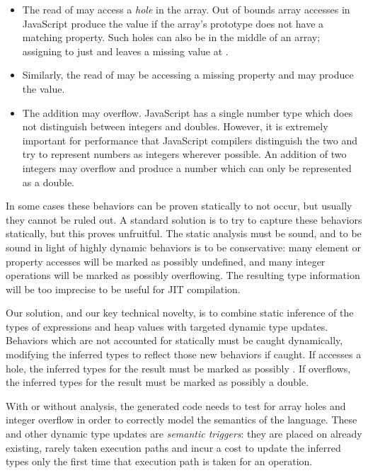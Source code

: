 \begin{itemize}

\item The read of  may access a {\it hole} in the array.
Out of bounds array accesses in JavaScript produce the
 value if the array's prototype
does not have a matching property.
Such holes can also be in the middle of an array;
assigning to just  and  leaves a missing
value at .

\item Similarly, the read of  may be accessing a missing property
and may produce the  value.

\item The addition  may overflow.
JavaScript has a single number type which does not distinguish between
integers and doubles.
However, it is extremely important for performance that JavaScript compilers
distinguish the two and try to represent numbers as
integers wherever possible.
An addition of two integers may overflow and produce a number which can
only be represented as a double.

\end{itemize}

In some cases these behaviors can be proven statically to not occur,
but usually they cannot be ruled out.
A standard solution is to try to capture these behaviors statically, but this proves
unfruitful. The static analysis must be sound, and to be sound in
light of highly dynamic behaviors is to be conservative: many element or property
accesses will be marked as possibly undefined, and many integer operations
will be marked as possibly overflowing.
The resulting type information will be too imprecise to be useful for
JIT compilation.

Our solution, and our key technical novelty, is to combine static inference
of the types of expressions and heap values
with targeted dynamic type updates.
Behaviors which are not accounted for statically must be caught dynamically,
modifying the inferred types to reflect
those new behaviors if caught.
If  accesses a hole, the inferred types for the result must be
marked as possibly .
If  overflows, the inferred types for the result must be
marked as possibly a double.

With or without analysis, the generated code needs to test for array holes
and integer overflow in order to correctly model the semantics of the language.
These and other dynamic type updates are {\it semantic triggers}:
they are placed on already existing, rarely taken execution paths
and incur a cost to update the inferred types only the first time that
execution path is taken for an operation.

